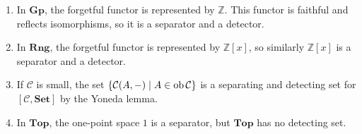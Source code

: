 \begin{example}
    \begin{enumerate}
        \item In \( \mathbf{Gp} \), the forgetful functor is represented by \( \mathbb Z \).
        This functor is faithful and reflects isomorphisms, so it is a separator and a detector.
        \item In \( \mathbf{Rng} \), the forgetful functor is represented by \( \mathbb Z[x] \), so similarly \( \mathbb Z[x] \) is a separator and a detector.
        \item If \( \mathcal C \) is small, the set \( \qty{\mathcal C(A, -) \mid A \in \operatorname{ob}\mathcal C} \) is a separating and detecting set for \( [\mathcal C, \mathbf{Set}] \) by the Yoneda lemma.
        \item In \( \mathbf{Top} \), the one-point space \( 1 \) is a separator, but \( \mathbf{Top} \) has no detecting set.
    \end{enumerate}
\end{example}
